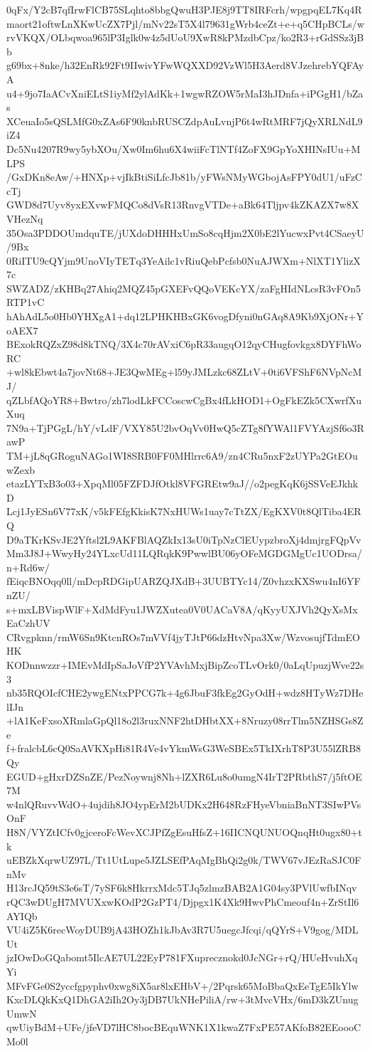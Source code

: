 0qFx/Y2cB7qfIrwFlCB75SLqhto8bbgQwuH3PJE8j9TT8IRFcrh/wpgpqEL7Kq4R
maort21oftwLnXKwUcZX7Pjl/mNv22sT5X4l79631gWrb4ceZt+e+q5CHpBCLs/w
rvVKQX/OLbqwoa965lP3Iglk0w4z5dUoU9XwR8kPMzdbCpz/ko2R3+rGdSSz3jBb
g69bx+8nke/h32EnRk92Ft9IIwivYFwWQXXD92VzWl5H3Aerd8VJzehrebYQFAyA
u4+9jo7IaACvXniELtS1iyMf2ylAdKk+1wgwRZOW5rMaI3hJDnfa+iPGgH1/bZas
XCeuaIo5sQSLMfG0xZAs6F90knbRUSCZdpAuLvnjP6t4wRtMRF7jQyXRLNdL9iZ4
Dc5Nu4207R9wy5ybXOu/Xw0Im6hu6X4wiiFcTlNTf4ZoFX9GpYoXHINsIUu+MLPS
/GxDKn8eAw/+HNXp+vjIkBtiSiLfcJb81b/yFWsNMyWGbojAsFPY0dU1/uFzCcTj
GWD8d7Uyv8yxEXvwFMQCo8dVsR13RnvgVTDe+aBk64Tljpv4kZKAZX7w8XVHezNq
35Osa3PDDOUmdquTE/jUXdoDHHHxUmSo8cqHjm2X0bE2lYucwxPvt4CSaeyU/9Bx
0RiITU9cQYjm9UnoVIyTETq3YeAilc1vRiuQebPcfsb0NuAJWXm+NlXT1YlizX7c
SWZADZ/zKHBq27Ahiq2MQZ45pGXEFvQQoVEKcYX/zaFgHIdNLcsR3vFOn5RTP1vC
hAhAdL5o0Hb0YHXgA1+dq12LPHKHBxGK6vogDfyni0nGAq8A9Kb9XjONr+YoAEX7
BExokRQZxZ98d8kTNQ/3X4c70rAVxiC6pR33augqO12qyCHugfovkgx8DYFhWoRC
+wl8kEbwt4a7jovNt68+JE3QwMEg+l59yJMLzkc68ZLtV+0ti6VFShF6NVpNcMJ/
qZLbfAQoYR8+Bwtro/zh7lodLkFCCoscwCgBx4fLkHOD1+OgFkEZk5CXwrfXuXuq
7N9a+TjPGgL/hY/vLdF/VXY85U2bvOqVv0HwQ5cZTg8fYWAl1FVYAzjSf6o3RawP
TM+jL8qGRoguNAGo1WI8SRB0FF0MHlrrc6A9/zn4CRu5nxF2zUYPa2GtEOuwZexb
etazLYTxB3o03+XpqMl05FZFDJfOtkl8VFGREtw9aJ//o2pegKqK6jSSVeEJkhkD
Lcj1JyESn6V77xK/v5kFEfgKkisK7NxHUWs1uay7cTtZX/EgKXV0t8QlTiba4ERQ
D9aTKrKSvJE2Yftsl2L9AKFBlAQZkIx13sU0iTpNzClEUypzbroXj4dmjrgFQpVv
Mm3J8J+WwyHy24YLxcUd11LQRqkK9PwwlBU06yOFeMGDGMgUc1UODrsa/n+Rd6w/
fEiqcBNOqq0ll/mDcpRDGipUARZQJXdB+3UUBTYc14/Z0vhzxKXSwu4nI6YFnZU/
s+mxLBVispWlF+XdMdFyu1JWZXutea0V0UACaV8A/qKyyUXJVh2QyXsMxEaCzhUV
CRvgpknn/rmW6Sn9KtcnROs7mVVf4jyTJtP66dzHtvNpa3Xw/WzvosujfTdmEOHK
KODnnwzzr+IMEvMdIpSaJoVfP2YVAvhMxjBipZcoTLvOrk0/0aLqUpuzjWve22s3
nb35RQOIcfCHE2ywgENtxPPCG7k+4g6JbuF3fkEg2GyOdH+wdz8HTyWz7DHelIJn
+lA1KeFxsoXRmlaGpQl18o2l3ruxNNF2htDHbtXX+8Nruzy08rrTlm5NZHSGs8Ze
f+fralcbL6cQ0SaAVKXpHi81R4Ve4vYkmWsG3WeSBEx5TkIXrhT8P3U55lZRB8Qy
EGUD+gHxrDZSnZE/PezNoywnj8Nh+lZXR6Lu8o0umgN4IrT2PRbthS7/j5ftOE7M
w4nlQRuvvWdO+4ujdih8JO4ypErM2bUDKx2H648RzFHyeVbniaBnNT3SIwPVsOnF
H8N/VYZtICfv0gjceroFcWevXCJPfZgEsuHfsZ+16IICNQUNUOQnqHt0ugx80+tk
uEBZkXqrwUZ97L/Tt1UtLupe5JZLSEfPAqMgBhQi2g0k/TWV67vJEzRaSJC0FnMv
H13rcJQ59tS3e6sT/7ySF6k8HkrrxMdc5TJq5zlmzBAB2A1G04sy3PVlUwfbINqv
rQC3wDUgH7MVUXxwKOdP2GzPT4/Djpgx1K4Xk9HwvPhCmeouf4n+ZrStIl6AYIQb
VU4iZ5K6recWoyDUB9jA43HOZh1kJbAv3R7U5uegcJfcqi/qQYrS+V9gog/MDLUt
jzIOwDoGQabomt5IlcAE7UL22EyP781FXuprecznokd0JcNGr+rQ/HUeHvuhXqYi
MFvFGe0S2yccfgpyphv0xwg8iX5ar8lxEHbV+/2Pqrsk65MoBbaQxEeTgE5IkYlw
KxcDLQkKxQ1DhGA2iIh2Oy3jDB7UkNHePiliA/rw+3tMvcVHx/6mD3kZUnugUmwN
qwUiyBdM+UFe/jfeVD7lHC8bocBEquWNK1X1kwaZ7FxPE57AKfoB82EEoooCMo0l
